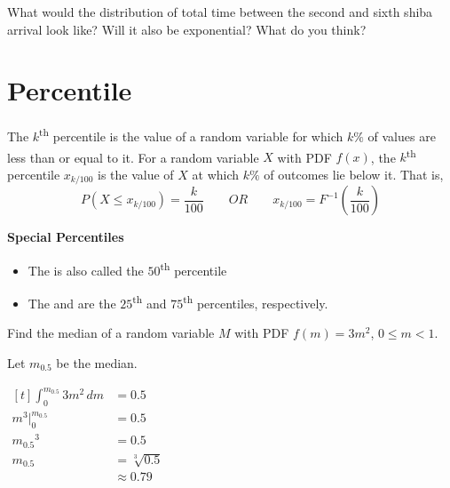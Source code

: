 What would the distribution of total time between the second and sixth shiba arrival look like? Will it also be exponential? What do you think?


\section{Percentile}

\begin{definition}[Percentile]
    The $k$\textsuperscript{th} percentile is the value of a random variable for which $k\%$ of values are less than or equal to it. For a random variable $X$ with PDF $f(x)$, the $k$\textsuperscript{th} percentile $x_{k/100}$ is the value of $X$ at which $k\%$ of outcomes lie below it. That is, $$P(X \le x_{k/100}) = \frac{k}{100} \qquad OR \qquad x_{k/100} = F^{-1} \left( \frac{k}{100} \right)$$
\end{definition}

\textbf{Special Percentiles}

\begin{itemize}
    \item The  is also called the $50$\textsuperscript{th} percentile
    \item The  and  are the $25$\textsuperscript{th} and $75$\textsuperscript{th} percentiles, respectively. 
\end{itemize}

\begin{example}
    Find the median of a random variable $M$ with PDF $f(m) = 3m^2$, $0 \le m < 1$. 

    Let $m_{0.5}$ be the median. 

    $\begin{aligned}[t]
        \int_{0}^{m_{0.5}} 3m^2 \,dm & = 0.5           \\
        m^3 \bigg|_{0}^{m_{0.5}}     & = 0.5           \\
        {m_{0.5}}^3                  & = 0.5           \\
        m_{0.5}                      & = \sqrt[3]{0.5} \\
                                     & \approx 0.79
    \end{aligned}$
\end{example}

